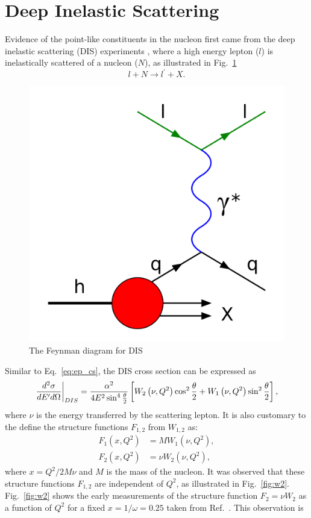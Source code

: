 \section {Deep Inelastic Scattering}
\label{sec:dis}
Evidence of the point-like constituents in the nucleon first came from the deep
inelastic scattering (DIS) experiments \cite{breidenbach1969}, where a high 
energy lepton ($l$) is inelastically scattered of a nucleon ($N$), as 
illustrated in Fig.\ \ref{fig:DIS}
\begin{equation}
	l + N \rightarrow l^\prime + X.
\end{equation}
\begin{figure}[htbp!]
    \centering
    \includegraphics[width=0.3\linewidth]{./images/DIS}
    \caption{The Feynman diagram for DIS}
    \label{fig:DIS}
\end{figure}
Similar to Eq.\ \ref{eq:ep_cs}, the DIS cross section can be expressed as 
\begin{equation}
	\eval{\frac{d^2\sigma}{dE^\prime d\Omega}}_{DIS} = \frac{\alpha^2}{4E^2 \sin^4 
	\frac{\theta}{2}} \left[ W_2\left(\nu,Q^2\right)\cos^2
	\frac{\theta}{2} + W_1\left(\nu,Q^2\right)\sin^2 \frac{\theta}{2}
	\right],
	\label{eq:DIS_cs1}
\end{equation}
where $\nu$ is the energy transferred by the scattering lepton. It is also 
customary to the define the structure functions $F_{1,2}$ from $W_{1,2}$ as:
\begin{equation}
	\begin{split}
		F_1\left(x,Q^2\right) &= MW_1\left(\nu,Q^2\right),\\
		F_2\left(x,Q^2\right) &= \nu W_2\left(\nu,Q^2\right),
	\end{split}
\end{equation}
where $x=Q^2/2M\nu$ and $M$ is the mass of the nucleon. It was observed that 
these structure functions $F_{1,2}$ are independent of $Q^2$, as illustrated in
Fig.\ \ref{fig:w2}. Fig.\ \ref{fig:w2} shows the early measurements of the 
structure function $F_2=\nu W_2$ as a function of $Q^2$ for a fixed 
$x=1/\omega=0.25$ taken from Ref.\ \cite{friedman1972}. This observation is 
